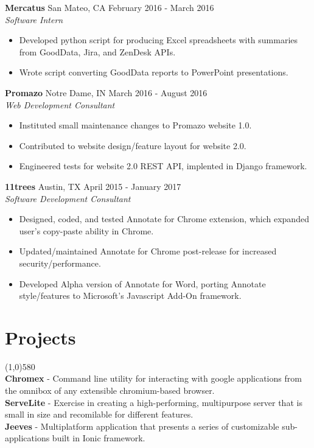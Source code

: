 \documentclass[9pt]{article}
\begin{document}
    \textbf{Mercatus}
    \tab
    San Mateo, CA
    \hfill
    February 2016 - March 2016
    \\
    \textit{Software Intern}
    \begin{itemize}
      \item Developed python script for producing Excel spreadsheets with summaries from GoodData, Jira, and ZenDesk APIs.
      \item Wrote script converting GoodData reports to PowerPoint presentations.
    \end{itemize}
    
    \textbf{Promazo}
    \tab
    Notre Dame, IN
    \hfill
    March 2016 - August 2016
    \\
    \textit{Web Development Consultant}
    \begin{itemize}
      \item Instituted small maintenance changes to Promazo website 1.0.
      \item Contributed to website design/feature layout for website 2.0.
      \item Engineered tests for website 2.0 REST API, implented in Django framework.
    \end{itemize}
  
    \textbf{11trees}
    \tab
    Austin, TX
    \hfill
    April 2015 - January 2017
    \\
    \textit{Software Development Consultant}
    \begin{itemize}
      \item Designed, coded, and tested Annotate for Chrome extension, which expanded user's copy-paste ability in Chrome.
      \item Updated/maintained Annotate for Chrome post-release for increased security/performance.
      \item Developed Alpha version of Annotate for Word, porting Annotate style/features to Microsoft's Javascript Add-On framework.
    \end{itemize}
 

  \vspace{-16pt}
  \section*{Projects}
    \vspace{-16pt}
    \line(1,0){580}\\
    \textbf{Chromex} - Command line utility for interacting with google applications from the omnibox of any extensible chromium-based browser.
    \\
    \textbf{ServeLite} - Exercise in creating a high-performing, multipurpose server that is small in size and recomilable for different features.
    \\
    \textbf{Jeeves} - Multiplatform application that presents a series of customizable sub-applications built in Ionic framework.
\end{document}
